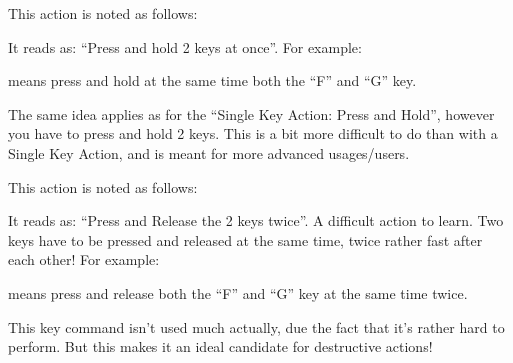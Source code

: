This action is noted as follows:
\begin{quotation}
\end{quotation}
It reads as: ``Press and hold 2 keys at once''. For example:
\begin{quotation}
\end{quotation}
means press and hold at the same time both the ``F'' and ``G'' key.

The same idea applies as for the ``Single Key Action: Press and Hold'', however you have to press and hold 2 keys. This is a bit more difficult to do than with a Single Key Action, and is meant for more advanced usages/users.

 This action is noted as follows:
\begin{quotation}
\end{quotation}
It reads as: ``Press and Release the 2 keys twice''. A difficult action to learn. Two keys have to be pressed and released at the same time, twice rather fast after each other! For example:
\begin{quotation}
\end{quotation}
means press and release both the ``F'' and ``G'' key at the same time twice.

This key command isn't used much actually, due the fact that it's rather hard to perform. But this makes it an ideal candidate for destructive actions!


